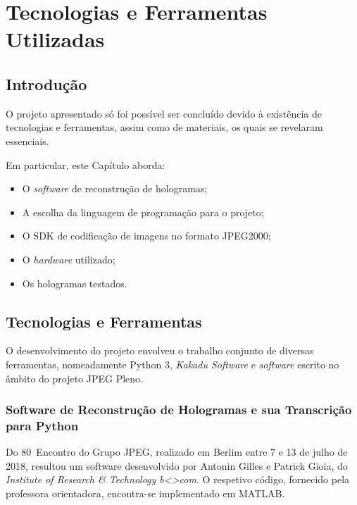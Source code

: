 \chapter{Tecnologias e Ferramentas Utilizadas}
\label{ch::tecno-ferr}

\section{Introdução}
\label{sec::tecno-ferr:intro}

O projeto apresentado só foi possível ser concluído devido à existência de tecnologias e ferramentas, assim como de materiais, os quais se revelaram essenciais.

Em particular, este Capítulo aborda:

\begin{itemize}
    \item O \textit{software} de reconstrução de hologramas;
    \item A escolha da linguagem de programação para o projeto;
    \item O \ac{SDK} de codificação de imagens no formato JPEG2000;
    \item O \textit{hardware} utilizado;
    \item Os hologramas testados.
\end{itemize}



\section{Tecnologias e Ferramentas}
\label{sec::tecno-ferr:tecno-ferr}

O desenvolvimento do projeto envolveu o trabalho conjunto de diversas ferramentas, nomeadamente Python 3, \textit{Kakadu Software} e \textit{software} escrito no âmbito do projeto JPEG Pleno.

\subsection{Software de Reconstrução de Hologramas e sua Transcrição para Python}

Do 80\textordmasculine~Encontro do Grupo JPEG, realizado em Berlim entre 7 e 13 de julho de 2018, resultou um software desenvolvido por Antonin Gilles e Patrick Gioia, do \textit{Institute of Research \& Technology b<>com}. O respetivo código, fornecido pela professora orientadora, encontra-se implementado em MATLAB.

